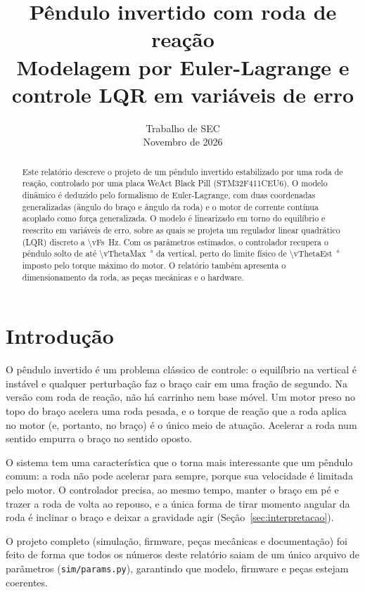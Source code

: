 \documentclass[11pt,a4paper]{article}
\title{\textbf{Pêndulo invertido com roda de reação}\\[4pt]
  \large Modelagem por Euler-Lagrange e controle LQR em variáveis de erro}
\author{}
\date{Trabalho de SEC \\[2pt] Novembro de 2026}
\begin{document}
\maketitle

\begin{abstract}
\noindent
Este relatório descreve o projeto de um pêndulo invertido estabilizado por uma roda de
reação, controlado por uma placa WeAct Black Pill (STM32F411CEU6). O modelo dinâmico é
deduzido pelo formalismo de Euler-Lagrange, com duas coordenadas generalizadas (ângulo
do braço e ângulo da roda) e o motor de corrente contínua acoplado como força generalizada.
O modelo é linearizado em torno do equilíbrio e reescrito em variáveis de erro, sobre as
quais se projeta um regulador linear quadrático (LQR) discreto a \qty{\vFs}{\hertz}.
Com os parâmetros estimados, o controlador recupera o pêndulo solto de até
\qty{\vThetaMax}{\degree} da vertical, perto do limite físico de
\qty{\vThetaEst}{\degree} imposto pelo torque máximo do motor. O relatório também
apresenta o dimensionamento da roda, as peças mecânicas e o hardware.
\end{abstract}

\tableofcontents
\newpage

\section{Introdução}

O pêndulo invertido é um problema clássico de controle: o equilíbrio na vertical é
instável e qualquer perturbação faz o braço cair em uma fração de segundo. Na versão
com roda de reação, não há carrinho nem base móvel. Um motor preso no topo do braço
acelera uma roda pesada, e o torque de reação que a roda aplica no motor (e, portanto,
no braço) é o único meio de atuação. Acelerar a roda num sentido empurra o braço no
sentido oposto.

O sistema tem uma característica que o torna mais interessante que um pêndulo comum:
a roda não pode acelerar para sempre, porque sua velocidade é limitada pelo motor. O
controlador precisa, ao mesmo tempo, manter o braço em pé e trazer a roda de volta ao
repouso, e a única forma de tirar momento angular da roda é inclinar o braço e deixar
a gravidade agir (Seção~\ref{sec:interpretacao}).

O projeto completo (simulação, firmware, peças mecânicas e documentação) foi feito de
forma que todos os números deste relatório saiam de um único arquivo de parâmetros
(\texttt{sim/params.py}), garantindo que modelo, firmware e peças estejam coerentes.
\end{document}
